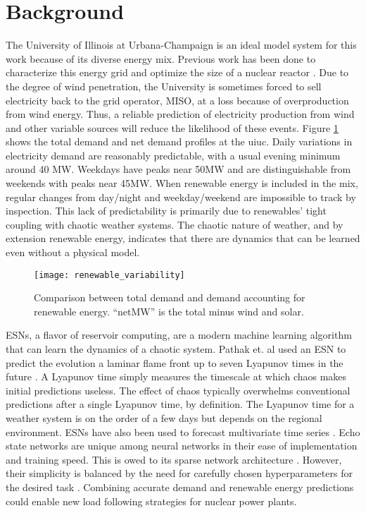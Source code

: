 \section{Background}


The University of Illinois at Urbana-Champaign is an ideal model system for
this work because of its diverse energy mix. Previous work has been done to
characterize this energy grid and optimize the size of a nuclear reactor
\cite{dotson_optimal_2020}. Due to the degree of wind penetration, the
University is sometimes
forced to sell electricity back to the grid operator, MISO, at a loss because
of overproduction
from wind energy. Thus, a reliable prediction of electricity production from
wind and other variable sources will reduce the likelihood of these events.
Figure \ref{figure:vre} shows the total demand and net demand profiles at the
\gls{uiuc}.
Daily variations in electricity demand are reasonably predictable, with a
usual evening minimum around 40 MW. Weekdays have peaks near 50MW and are
distinguishable from weekends with peaks near 45MW. When renewable energy is
included in the mix, regular changes from day/night and weekday/weekend are
impossible to track by inspection. This lack of predictability is primarily due
to renewables' tight coupling with chaotic weather systems. The chaotic nature
of weather, and by extension renewable energy, indicates that there are
dynamics that can be learned even without a physical model.
\begin{figure}[h]
  \centering
  \texttt{[image: renewable\_variability]}
  \caption{Comparison between total demand and demand accounting for renewable
   energy. ``netMW'' is the total minus wind and solar.}
  \label{figure:vre}
\end{figure}

\glspl{ESN}, a flavor of reservoir computing, are a modern
machine learning algorithm that can learn the dynamics of a chaotic system.
Pathak et. al used an \gls{ESN} to predict the
evolution a laminar flame front up to seven Lyapunov
times in the future \cite{pathak_model-free_2018, wikner_combining_2020}. A
Lyapunov time simply measures the timescale at which chaos makes initial
predictions useless. The effect of chaos typically overwhelms conventional
predictions after a single Lyapunov time, by definition.
The Lyapunov time for a weather system is on the order of a few days but
depends on the regional environment. \glspl{ESN} have also been used to
forecast multivariate time series \cite{bianchi_reservoir_2020}. Echo state
networks are unique among neural
networks in their ease of implementation and training speed. This is owed to its
sparse network architecture \cite{pathak_model-free_2018,
wikner_combining_2020, vannitsem_predictability_2017}. However,
their simplicity is balanced by the need for carefully chosen hyperparameters
for the desired task \cite{lukosevicius_practical_2012}.
Combining accurate demand and
renewable energy predictions could enable new load following strategies for
nuclear power plants.
